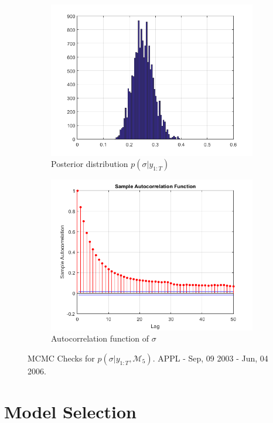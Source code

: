 \documentclass[11pt,a4,twosided,singlespacing,titlepagenumber=on]{scrreprt}
\numberwithin{equation}{chapter} %
\theoremstyle{remark}
\begin{document}
\begin{figure}[H]
\begin{subfigure}[t]{0.42\textwidth}
        \includegraphics[width=1\textwidth]{sigma_svm/3}
        \caption{Posterior distribution $p(\sigma|y_{1:T})$}
        \label{sigma_svm_3}
    \end{subfigure}
    \begin{subfigure}[t]{0.42\textwidth}
        \centering
        \includegraphics[width=1\textwidth]{sigma_svm/4}
        \caption{Autocorrelation function of $\sigma$}
        \label{sigma_svm_4}
    \end{subfigure}
    \caption{MCMC Checks for $p(\sigma|y_{1:T}, \mathcal{M}_5)$. APPL - Sep, 09 2003 - Jun, 04 2006.}
    \label{sigma_svm_checks}
\end{figure}


\section{Model Selection}
\end{document}
